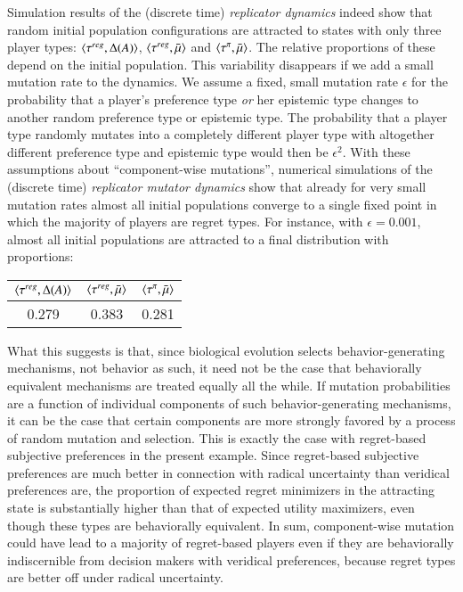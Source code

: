 \documentclass[fleqn,reqno,11pt]{article}
\begin{document}
Simulation results of the (discrete time) \emph{replicator dynamics}
\citep{TaylorJonker1978:Evolutionary-St} indeed show that random initial population
configurations are attracted to states with only three player types:
$\left \langle \tau^{reg}, \Delta(A)\right\rangle$, $\left \langle \tau^{reg}, \bar{\mu}\right\rangle$ and
$\left \langle \tau^{\pi}, \bar{\mu}\right\rangle$. The relative proportions of these depend on the initial
population. This
variability disappears if we add a small mutation rate to the dynamics. We assume a fixed,
small mutation rate $\epsilon$ for the probability that a player's preference type \emph{or}
her epistemic type changes to another random preference type or epistemic type. The probability
that a player type randomly mutates into a completely different player type with altogether
different preference type and epistemic type would then be $\epsilon^2$. With these assumptions
about ``component-wise mutations'', numerical simulations of the (discrete time)
\emph{replicator mutator dynamics} \citep{Nowak2006:Evolutionary-Dy} show that already for very
small mutation rates almost all initial populations converge to a single fixed point in which
the majority of players are regret types. For instance, with $\epsilon = 0.001$, almost all
initial populations are attracted to a final distribution with proportions:

\begin{center}
  \begin{tabular}{ccc}
    $\left \langle \tau^{reg}, \Delta(A)\right\rangle$ & $\left \langle \tau^{reg},
      \bar{\mu}\right\rangle$ & $\left \langle \tau^{\pi}, \bar{\mu}\right\rangle$ \\ \hline
    0.279  &   0.383 &    0.281 
  \end{tabular}
\end{center}

What this suggests is that, since biological evolution selects behavior-generating mechanisms,
not behavior as such, it need not be the case that behaviorally equivalent mechanisms are
treated equally all the while. If mutation probabilities are a function of individual
components of such behavior-generating mechanisms, it can be the case that certain components
are more strongly favored by a process of random mutation and selection. This is exactly the
case with regret-based subjective preferences in the present example. Since regret-based
subjective preferences are much better in connection with radical uncertainty than veridical
preferences are, the proportion of expected regret minimizers in the attracting state is
substantially higher than that of expected utility maximizers, even though these types are
behaviorally equivalent. In sum, component-wise mutation could have lead to a majority of
regret-based players even if they are behaviorally indiscernible from decision makers with
veridical preferences, because regret types are better off under radical uncertainty.
\end{document}
